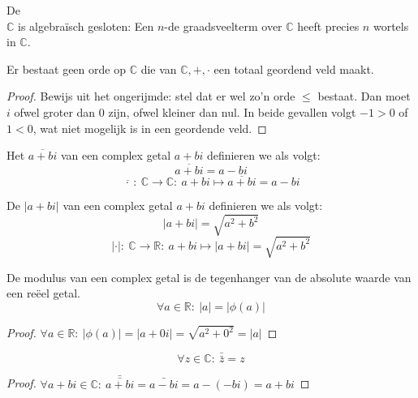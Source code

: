 \documentclass[main.tex]{subfiles}
\begin{document}
\begin{st}
  De \\
  $\mathbb{C}$ is algebra\"isch gesloten: Een $n$-de graadsveelterm over $\mathbb{C}$ heeft precies $n$ wortels in $\mathbb{C}$.
  \zb
\end{st}

\begin{pr}
  Er bestaat geen orde op $\mathbb{C}$ die van $\mathbb{C},+,\cdot$ een totaal geordend veld maakt.

  \begin{proof}
    Bewijs uit het ongerijmde: stel dat er wel zo'n orde $\le$ bestaat.
    Dan moet $i$ ofwel groter dan $0$ zijn, ofwel kleiner dan nul.
    In beide gevallen volgt $-1 > 0$ of $1 < 0$, wat niet mogelijk is in een geordende veld.
  \end{proof}
\end{pr}

\begin{de}
  Het  $\overline{a+bi}$ van een complex getal $a+bi$ definieren we als volgt:
  \[ \overline{a+bi} = a-bi \]
  \[ \overline{\, \cdot\ }:\ \mathbb{C} \rightarrow \mathbb{C}:\ a+bi \mapsto \overline{a+bi} = a-bi \]
\end{de}

\begin{de}
  De  $|a+bi|$ van een complex getal $a+bi$ definieren we als volgt:
  \[ |a+bi| = \sqrt{a^{2}+b^{2}} \]
  \[ |\cdot|:\ \mathbb{C} \rightarrow \mathbb{R}:\ a+bi \mapsto |a+bi| = \sqrt{a^{2}+b^{2}} \]
\end{de}

\begin{ei}
  De modulus van een complex getal is de tegenhanger van de absolute waarde van een re\"eel getal.
  \[ \forall a \in \mathbb{R}:\ |a| = |\phi(a)| \]
  \begin{proof}
    $\forall a\in \mathbb{R}:\ |\phi(a)| = |a+0i| = \sqrt{a^{2} + 0^{2}} = |a|$
  \end{proof}
\end{ei}

\begin{pr}
  \[ \forall z\in \mathbb{C}:\ \bar{\bar{z}} = z \]

  \begin{proof}
    $\forall a+bi\in \mathbb{C}:\ \bar{\bar{a+bi}} = \bar{a-bi} = a-(-bi) = a+bi$
  \end{proof}
\end{pr}
\end{document}
